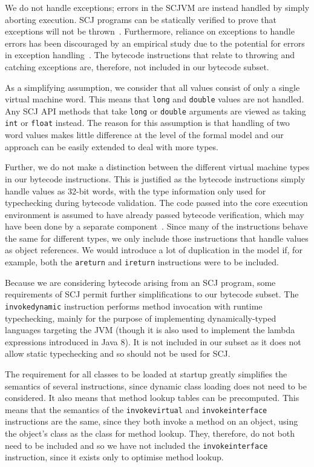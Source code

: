 We do not handle exceptions; errors in the SCJVM are instead handled
by simply aborting execution.
SCJ programs can be statically verified to prove that exceptions will
not be thrown~\cite{kalibera2010,marriott2014}.
Furthermore, reliance on exceptions to handle errors has been
discouraged by an empirical study due to the potential for errors in
exception handling~\cite{sawadpong2012}.
The bytecode instructions that relate to throwing and catching
exceptions are, therefore, not included in our bytecode subset.

As a simplifying assumption, we consider that all values consist of
only a single virtual machine word.
This means that \texttt{long} and \texttt{double} values are not
handled.
Any SCJ API methods that take \texttt{long} or \texttt{double}
arguments are viewed as taking \texttt{int} or \texttt{float} instead.
The reason for this assumption is that handling of two word values
makes little difference at the level of the formal model and our
approach can be easily extended to deal with more types.

Further, we do not make a distinction between the different virtual
machine types in our bytecode instructions.
This is justified as the bytecode instructions simply handle values as
32-bit words, with the type information only used for typechecking
during bytecode validation. 
The code passed into the core execution environment is assumed to have
already passed bytecode verification, which may have been done by a
separate component~\cite{klein2003, stark2001, coglio2000,
  xavier2003}. 
Since many of the instructions behave the same for different types, we
only include those instructions that handle values as object
references.
We would introduce a lot of duplication in the model if, for example,
both the \texttt{areturn} and \texttt{ireturn} instructions were to be
included.

Because we are considering bytecode arising from an SCJ program, some
requirements of SCJ permit further simplifications to our bytecode
subset.
The \texttt{invokedynamic} instruction performs method invocation with
runtime typechecking, mainly for the purpose of implementing
dynamically-typed languages targeting the JVM (though it is also used
to implement the lambda expressions introduced in Java 8).
It is not included in our subset as it does not allow static
typechecking and so should not be used for SCJ.

The requirement for all classes to be loaded at startup greatly
simplifies the semantics of several instructions, since dynamic class
loading does not need to be considered.
It also means that method lookup tables can be precomputed.
This means that the semantics of the \texttt{invokevirtual} and
\texttt{invokeinterface} instructions are the same, since they both
invoke a method on an object, using the object's class as the class
for method lookup.
They, therefore, do not both need to be included and so we have not
included the \texttt{invokeinterface} instruction, since it exists
only to optimise method lookup.

